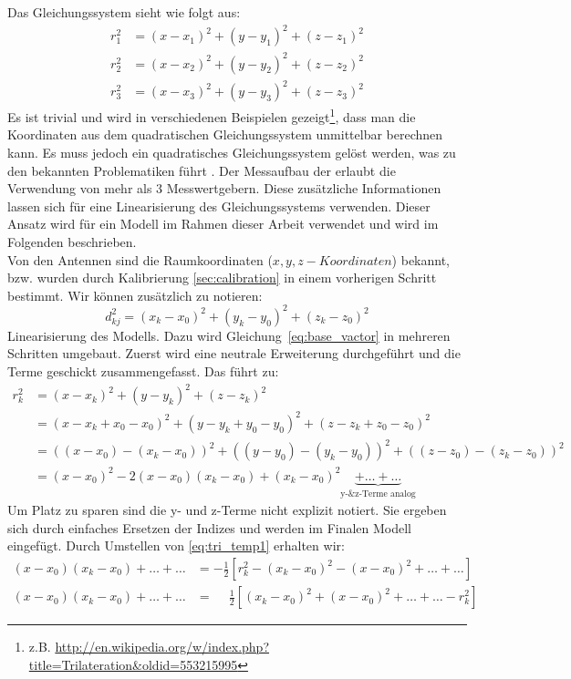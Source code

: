 %
Das Gleichungssystem sieht wie folgt aus:
%
\begin{align}
	r_{1}^2 &= (x-x_1)^2+(y-y_1)^2+(z-z_1)^2 \nonumber\\
	r_{2}^2 &= (x-x_2)^2+(y-y_2)^2+(z-z_2)^2 \nonumber\\
	r_{3}^2 &= (x-x_3)^2+(y-y_3)^2+(z-z_3)^2 \nonumber
%	
\end{align}
%
Es ist trivial und wird in verschiedenen Beispielen gezeigt\footnote{z.B. \url{http://en.wikipedia.org/w/index.php?title=Trilateration&oldid=553215995}}, dass man die Koordinaten aus dem quadratischen Gleichungssystem unmittelbar berechnen kann. Es muss jedoch ein quadratisches Gleichungssystem gelöst werden, was zu den bekannten Problematiken führt \cite{blabla}. Der Messaufbau der \amedogmbh erlaubt die Verwendung von mehr als 3 Messwertgebern. Diese zusätzliche Informationen lassen sich für eine Linearisierung des Gleichungssystems verwenden. Dieser Ansatz wird für ein Modell im Rahmen dieser Arbeit verwendet und wird im Folgenden beschrieben.\\
%
Von den Antennen sind die Raumkoordinaten ($x,y,z-Koordinaten$) bekannt, bzw. wurden durch Kalibrierung \ref{sec:calibration} in einem vorherigen Schritt bestimmt. Wir können zusätzlich zu notieren:
%
\begin{equation}\label{eq:d_k0}
	d_{kj}^2= (x_k-x_0)^2+(y_k-y_0)^2+(z_k-z_0)^2
\end{equation}
%
Linearisierung des Modells. Dazu wird Gleichung~\ref{eq:base_vactor} in mehreren Schritten umgebaut. Zuerst wird eine neutrale Erweiterung durchgeführt und die Terme geschickt zusammengefasst. Das führt zu:
%
\begin{align}
	r_{k}^2 &= (x-x_k)^2+(y-y_k)^2+(z-z_k)^2 \nonumber \\
	&=(x-x_k+x_0-x_0)^2+(y-y_k+y_0-y_0)^2+(z-z_k+z_0-z_0)^2 \nonumber \\
	&=((x-x_0)-(x_k-x_0))^2+((y-y_0)-(y_k-y_0))^2+((z-z_0)-(z_k-z_0))^2 \nonumber \\ 
	&=(x-x_0)^2-2(x-x_0)(x_k-x_0)+(x_k-x_0)^2\underbrace{+\dots{}+\dots{}}_\text{y-\& z-Terme analog}
	\label{eq:tri_temp1}
%
\end{align}
%
Um Platz zu sparen sind die y- und z-Terme nicht explizit notiert. Sie ergeben sich durch einfaches Ersetzen der Indizes und werden im Finalen Modell eingefügt. Durch Umstellen von \eqref{eq:tri_temp1} erhalten wir:
\begin{align}
(x-x_0)(x_k-x_0)+\dots{}+\dots{}&=-\frac{1}{2}[r_k^2-(x_k-x_0)^2 -(x-x_0)^2 +\dots{} +\dots{}]\nonumber\\
(x-x_0)(x_k-x_0)+\dots{}+\dots{}&=\phantom{-}\frac{1}{2}[(x_k-x_0)^2 +(x-x_0)^2 +\dots{}+\dots{}-r_k^2]\nonumber
%
\end{align}
